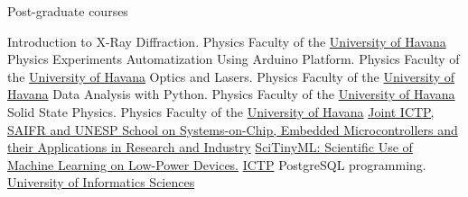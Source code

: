 \begin{rubric}{Post-graduate courses}

\entry*[2022] Introduction to X-Ray Diffraction. Physics Faculty of the \href{https://uh.cu/}{University of Havana}
\entry*[2022] Physics Experiments Automatization Using Arduino Platform. Physics Faculty of the \href{https://uh.cu/}{University of Havana}
\entry*[2022] Optics and Lasers. Physics Faculty of the \href{https://uh.cu/}{University of Havana}
\entry*[2022] Data Analysis with Python. Physics Faculty of the \href{https://uh.cu/}{University of Havana}
\entry*[2021] Solid State Physics. Physics Faculty of the \href{https://uh.cu/}{University of Havana}
\entry*[2021] \href{https://indico.ictp.it/event/9644/}{Joint ICTP, SAIFR and UNESP School on Systems-on-Chip, Embedded Microcontrollers and their Applications in Research and Industry}
\entry*[2021] \href{https://indico.ictp.it/event/9622/}{SciTinyML: Scientific Use of Machine Learning on Low-Power Devices.} \href{https://www.ictp.it/}{ICTP}
\entry*[2021] PostgreSQL programming. \href{https://www.uci.cu/en}{University of Informatics Sciences}

\end{rubric}